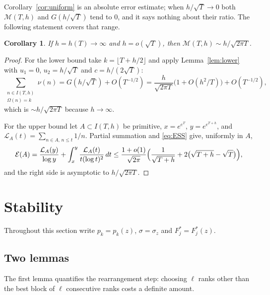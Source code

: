 \documentclass[11pt,a4paper]{article}
\numberwithin{equation}{section}
\theoremstyle{plain}
\newtheorem{corollary}[theorem]{Corollary}
\theoremstyle{definition}
\theoremstyle{remark}
\newcommand{\cE}{\mathcal{E}}
\newcommand{\cM}{\mathcal{M}}
\begin{document}
Corollary~\ref{cor:uniform} is an absolute error estimate; when $h/\sqrt T\to0$ both $\cM(T,h)$ and $G(h/\sqrt T)$ tend to $0$, and it says nothing about their ratio. The following statement covers that range.

\begin{corollary}\label{cor:short}
If $h=h(T)\to\infty$ and $h=o(\sqrt T)$, then $\cM(T,h)\sim h/\sqrt{2\pi T}$.
\end{corollary}

\begin{proof}
For the lower bound take $k=\lfloor T+h/2\rfloor$ and apply Lemma~\ref{lem:lower} with $u_1=0$, $u_2=h/\sqrt T$ and $c=h/(2\sqrt T)$:
\[
\sum_{\substack{n\in I(T,h)\\ \Omega(n)=k}}\nu(n)=G(h/\sqrt T)+O(T^{-1/2})=\frac{h}{\sqrt{2\pi T}}\bigl(1+O(h^2/T)\bigr)+O(T^{-1/2}),
\]
which is $\sim h/\sqrt{2\pi T}$ because $h\to\infty$.

For the upper bound let $A\subset I(T,h)$ be primitive, $x=e^{e^T}$, $y=e^{e^{T+h}}$, and $\mathcal L_A(t)=\sum_{n\in A,\,n\le t}1/n$. Partial summation and \eqref{eq:ESS} give, uniformly in $A$,
\[
\cE(A)=\frac{\mathcal L_A(y)}{\log y}+\int_x^y\frac{\mathcal L_A(t)}{t(\log t)^2}\,dt
\le\frac{1+o(1)}{\sqrt{2\pi}}\Bigl(\frac1{\sqrt{T+h}}+2\bigl(\sqrt{T+h}-\sqrt T\bigr)\Bigr),
\]
and the right side is asymptotic to $h/\sqrt{2\pi T}$.
\end{proof}

\section{Stability}\label{sec:stability}

Throughout this section write $p_k=p_k(z)$, $\sigma=\sigma_z$ and $F^*_j=F^*_j(z)$.

\subsection{Two lemmas}
The first lemma quantifies the rearrangement step: choosing $\ell$ ranks other than the best block of $\ell$ consecutive ranks costs a definite amount.
\end{document}
